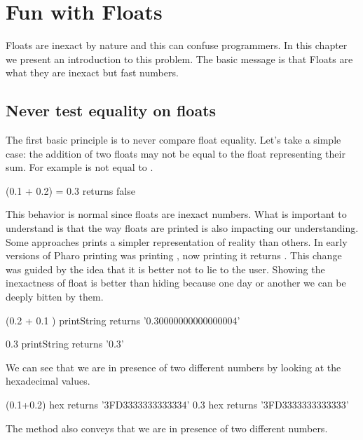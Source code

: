 \documentclass[a4paper,10pt,twoside]{book}
\begin{document}
\fi
\sloppy

\chapter{Fun with Floats}

Floats are inexact by nature and this can confuse programmers. In this chapter we present 
an introduction to this problem. The basic message is that Floats are what they are inexact 
but fast numbers.


\section{Never test equality on floats}
The first basic principle is to never compare float equality. 
Let's take a simple case: the addition of two floats may not be equal to the float representing their
sum. For example  is not equal to .

\begin{code}{}
(0.1 + 0.2) = 0.3
	returns false
\end{code}

This behavior is normal since floats are inexact numbers. What is important to understand is that the way floats are printed is also impacting our understanding. Some approaches prints a simpler representation of reality than others. In early versions of Pharo printing  was printing , now  printing it returns .
This change was guided by the idea that it is better not to lie to the user. Showing the inexactness of float is better than hiding because one day or another we can be deeply bitten by them. 

\begin{code}{}
(0.2 + 0.1 ) printString
	returns '0.30000000000000004' 

0.3 printString
	returns	'0.3'
\end{code}	

We can see that we are in presence of two different numbers by looking at the hexadecimal values. 

\begin{code}{}
(0.1+0.2) hex 
	returns '3FD3333333333334'
0.3 hex 
	returns '3FD3333333333333' 
\end{code}

	
The method  also conveys that we are in presence of two different numbers.
		
\end{document}
